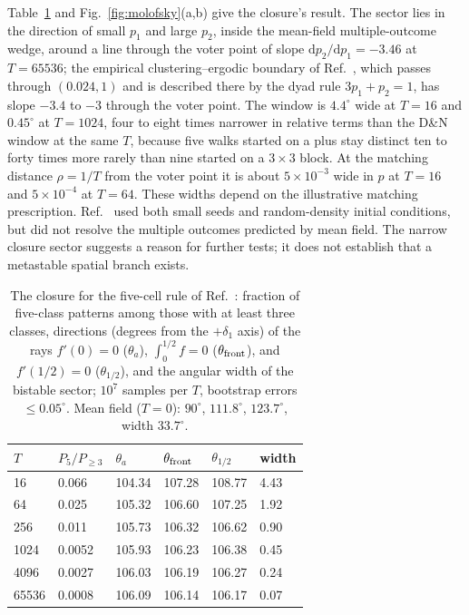 \documentclass[pre,twocolumn,superscriptaddress,showpacs,floatfix]{revtex4-2}
\newcommand{\ds}{\mathrm{d}}
\begin{document}
Table~\ref{tab:molofsky} and Fig.~\ref{fig:molofsky}(a,b) give the closure's result. The sector
lies in the direction of small $p_1$ and large $p_2$, inside the mean-field multiple-outcome
wedge, around a line through the voter point of slope $\ds p_2/\ds p_1 = -3.46$ at $T = 65536$;
the empirical clustering--ergodic boundary of Ref.~\cite{molofsky1999}, which passes through
$(0.024, 1)$ and is described there by the dyad rule $3p_1 + p_2 = 1$, has slope $-3.4$ to $-3$
through the voter point. The window is $4.4^\circ$ wide at $T = 16$ and $0.45^\circ$ at
$T = 1024$, four to eight times narrower in relative terms than the D\&N window at the same $T$,
because five walks started on a plus stay distinct ten to forty times more rarely than nine
started on a $3\times3$ block. At the matching distance $\rho = 1/T$ from the voter point it is
about $5\times10^{-3}$ wide in $p$ at $T = 16$ and $5\times10^{-4}$ at $T = 64$.
These widths depend on the illustrative matching prescription. Ref.~\cite{molofsky1999}
used both small seeds and random-density initial conditions, but did not resolve
the multiple outcomes predicted by mean field. The narrow closure sector suggests
a reason for further tests; it does not establish that a metastable spatial branch exists.

\begin{table}
\caption{The closure for the five-cell rule of Ref.~\cite{molofsky1999}: fraction of five-class
patterns among those with at least three classes, directions (degrees from the $+\delta_1$ axis)
of the rays $f'(0) = 0$ ($\theta_a$), $\int_0^{1/2} f = 0$ ($\theta_{\rm front}$), and
$f'(1/2) = 0$ ($\theta_{1/2}$), and the angular width of the bistable sector; $10^7$ samples per
$T$, bootstrap errors $\le 0.05^\circ$. Mean field ($T = 0$): $90^\circ$, $111.8^\circ$,
$123.7^\circ$, width $33.7^\circ$.}
\label{tab:molofsky}
\begin{ruledtabular}
\begin{tabular}{llllll}
$T$ & $P_5/P_{\ge3}$ & $\theta_a$ & $\theta_{\rm front}$ & $\theta_{1/2}$ & width \\
\hline
16 & 0.066 & 104.34 & 107.28 & 108.77 & 4.43 \\
64 & 0.025 & 105.32 & 106.60 & 107.25 & 1.92 \\
256 & 0.011 & 105.73 & 106.32 & 106.62 & 0.90 \\
1024 & 0.0052 & 105.93 & 106.23 & 106.38 & 0.45 \\
4096 & 0.0027 & 106.03 & 106.19 & 106.27 & 0.24 \\
65536 & 0.0008 & 106.09 & 106.14 & 106.17 & 0.07 \\
\end{tabular}
\end{ruledtabular}
\end{table}
\end{document}

